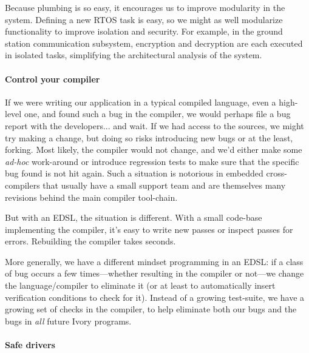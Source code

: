 Because plumbing is so easy, it encourages us to improve modularity in the
system.  Defining a new RTOS task is easy, so we might as well modularize
functionality to improve isolation and security.  For example, in the ground
station communication subsystem, encryption and decryption are each executed in
isolated tasks, simplifying the architectural analysis of the system.

\paragraph{Control your compiler}
If we were writing our application in a typical compiled language, even a
high-level one, and found such a bug in the compiler, we would perhaps file a
bug report with the developers... and wait.  If we had access to the sources, we
might try making a change, but doing so risks introducing new bugs or at the
least, forking.  Most likely, the compiler would not change, and we’d either
make some \emph{ad-hoc} work-around or introduce regression tests to make sure
that the specific bug found is not hit again.  Such a situation is notorious in
embedded cross-compilers that usually have a small support team and are
themselves many revisions behind the main compiler tool-chain.

But with an EDSL, the situation is different.  With a small code-base
implementing the compiler, it’s easy to write new passes or inspect passes for
errors.  Rebuilding the compiler takes seconds.

More generally, we have a different mindset programming in an EDSL: if a class
of bug occurs a few times---whether resulting in the compiler or not---we change
the language/compiler to eliminate it (or at least to automatically insert
verification conditions to check for it).  Instead of a growing test-suite, we
have a growing set of checks in the compiler, to help eliminate both our bugs
and the bugs in \emph{all} future Ivory programs.

\paragraph{Safe drivers}








